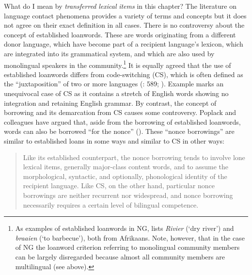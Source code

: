 \documentclass[output=paper]{langsci/langscibook}
\begin{document}
What do I mean by \textit{transferred} \textit{lexical} \textit{items} in this chapter? The literature on language contact phenomena provides a variety of terms and concepts but it does not agree on their exact definition in all cases. There is no controversy about the concept of established loanwords. These are words originating from a different donor language, which have become part of a recipient language’s lexicon, which are integrated into its grammatical system, and which are also used by monolingual speakers in the community.\footnote{As examples of established loanwords in NG, \citet[1185]{zimmer_deutsch_2019} lists \textit{Rivier} (‘dry river’) and \textit{braaien} (‘to barbecue’), both from Afrikaans. Note, however, that in the case of NG the loanword criterion referring to monolingual community members can be largely disregarded because almost all community members are multilingual (see above).} It is equally agreed that the use of established loanwords differs from code-switching (CS), which is often defined as the “juxtaposition” of two or more languages (\citealt{poplack_code-switching_2004}: 589; \citealt[460]{Auer.2011}). Example  marks an unequivocal case of CS as it contains a stretch of English words showing no integration and retaining English grammar. By contrast, the concept of borrowing and its demarcation from CS causes some controversy. Poplack and colleagues have argued that, aside from the borrowing of established loanwords, words can also be borrowed “for the nonce” (\citealt{poplack_social_1988, poplack_code-switching_2004, poplack_borrowing_2018}). These “nonce borrowings” are similar to established loans in some ways and similar to CS in other ways:

\begin{quotation}
Like its established counterpart, the nonce borrowing tends to involve lone lexical items, generally major-class content words, and to assume the morphological, syntactic, and optionally, phonological identity of the recipient language. Like CS, on the other hand, particular nonce borrowings are neither recurrent nor widespread, and nonce borrowing necessarily requires a certain level of bilingual competence. \citep[590]{poplack_code-switching_2004}\end{quotation}
\end{document}
